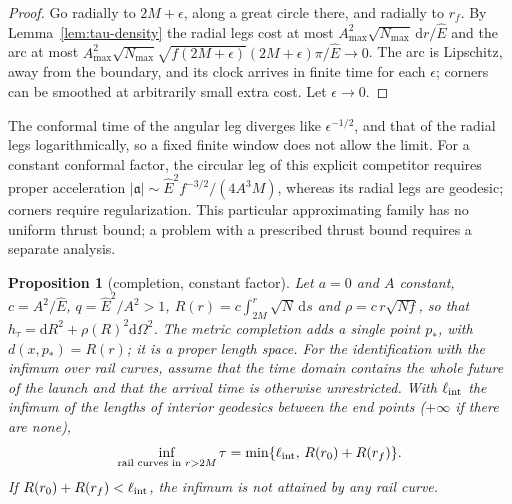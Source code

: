 \documentclass[aip,jmp,amsmath,amssymb,reprint]{revtex4-2}
\newcommand{\Ehat}{\hat E}
\newcommand{\dd}{\mathrm{d}}
\theoremstyle{plain}
\newtheorem{proposition}{Proposition}[section]
\theoremstyle{definition}
\begin{document}
\begin{proof}
Go radially to $2M+\epsilon$, along a great circle there, and radially to $r_f$. By
Lemma~\ref{lem:tau-density} the radial legs cost at most
$A_{\max}^2\sqrt{N_{\max}}\,\dd r/\Ehat$ and the arc at most
$A_{\max}^2\sqrt{N_{\max}}\sqrt{f(2M+\epsilon)}(2M+\epsilon)\pi/\Ehat\to0$. The arc is Lipschitz,
away from the boundary, and its clock arrives in finite time for each $\epsilon$; corners
can be smoothed at arbitrarily small extra cost. Let $\epsilon\to0$.
\end{proof}

The conformal time of the angular leg diverges like $\epsilon^{-1/2}$, and that of the radial
legs logarithmically, so a fixed finite window does not allow the limit. For a constant
conformal factor, the circular leg of this explicit competitor requires proper acceleration
$|\mathfrak a|\sim\Ehat^2f^{-3/2}/(4A^3M)$, whereas its radial legs are geodesic; corners
require regularization. This particular approximating family has no uniform thrust bound; a
problem with a prescribed thrust bound requires a separate analysis.

\begin{proposition}[completion, constant factor]\label{prop:completion}
Let $a=0$ and $A$ constant, $c=A^2/\Ehat$, $q=\Ehat^2/A^2>1$,
$R(r)=c\int_{2M}^r\sqrt{N}\,\dd s$ and $\rho=c\,r\sqrt{Nf}$, so that $h_\tau=\dd R^2+\rho(R)^2\dd\Omega^2$.
The metric completion adds a single point $p_*$, with $d(x,p_*)=R(r)$; it is a proper
length space. For the identification with the infimum over rail curves, assume that the time
domain contains the whole future of the launch and that the arrival time is otherwise
unrestricted. With $\ell_{\rm int}$ the infimum of the lengths of interior geodesics between
the end points ($+\infty$ if there are none),
\[
  \inf_{\text{rail curves in }r>2M}\tau=\min\{\ell_{\rm int},\,R(r_0)+R(r_f)\}.
\]
If $R(r_0)+R(r_f)<\ell_{\rm int}$, the infimum is not attained by any rail curve.
\end{proposition}
\end{document}
